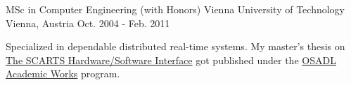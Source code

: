 
\begin{cventries}

  \cventry
    {MSc in Computer Engineering (with Honors)}
    {Vienna University of Technology}
    {Vienna, Austria}
    {Oct. 2004 - Feb. 2011}
    {
      \begin{cvprose}
      Specialized in dependable distributed real-time systems. My master's thesis on {\color{awesome}\href{https://www.amazon.com/SCARTS-Hardware-Software-Interface-Academic/dp/3000361928}{The SCARTS Hardware/Software Interface}} got published under the {\color{awesome}\href{http://www.osadl.org/OSADL-Books.academic-works.0.html}{OSADL Academic Works}} program.
      \end{cvprose}
    }

\end{cventries}
